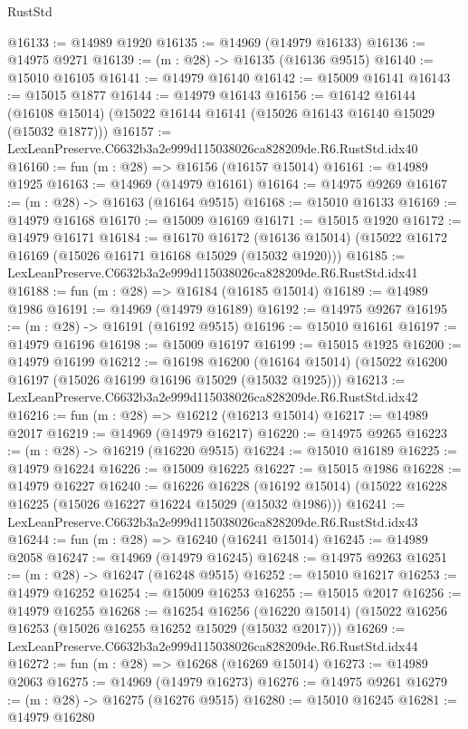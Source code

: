 \begin{lexlean}{RustStd}
\begin{coremodule}
@16133 := @14989 @1920
@16135 := @14969 (@14979 @16133)
@16136 := @14975 @9271
@16139 := (m : @28) -> @16135 (@16136 @9515)
@16140 := @15010 @16105
@16141 := @14979 @16140
@16142 := @15009 @16141
@16143 := @15015 @1877
@16144 := @14979 @16143
@16156 := @16142
    @16144
    (@16108 @15014)
    (@15022 @16144 @16141 (@15026 @16143 @16140 @15029 (@15032 @1877)))
@16157 := LexLeanPreserve.C6632b3a2e999d115038026ca828209de.R6.RustStd.idx40
@16160 := fun (m : @28) => @16156 (@16157 @15014)
@16161 := @14989 @1925
@16163 := @14969 (@14979 @16161)
@16164 := @14975 @9269
@16167 := (m : @28) -> @16163 (@16164 @9515)
@16168 := @15010 @16133
@16169 := @14979 @16168
@16170 := @15009 @16169
@16171 := @15015 @1920
@16172 := @14979 @16171
@16184 := @16170
    @16172
    (@16136 @15014)
    (@15022 @16172 @16169 (@15026 @16171 @16168 @15029 (@15032 @1920)))
@16185 := LexLeanPreserve.C6632b3a2e999d115038026ca828209de.R6.RustStd.idx41
@16188 := fun (m : @28) => @16184 (@16185 @15014)
@16189 := @14989 @1986
@16191 := @14969 (@14979 @16189)
@16192 := @14975 @9267
@16195 := (m : @28) -> @16191 (@16192 @9515)
@16196 := @15010 @16161
@16197 := @14979 @16196
@16198 := @15009 @16197
@16199 := @15015 @1925
@16200 := @14979 @16199
@16212 := @16198
    @16200
    (@16164 @15014)
    (@15022 @16200 @16197 (@15026 @16199 @16196 @15029 (@15032 @1925)))
@16213 := LexLeanPreserve.C6632b3a2e999d115038026ca828209de.R6.RustStd.idx42
@16216 := fun (m : @28) => @16212 (@16213 @15014)
@16217 := @14989 @2017
@16219 := @14969 (@14979 @16217)
@16220 := @14975 @9265
@16223 := (m : @28) -> @16219 (@16220 @9515)
@16224 := @15010 @16189
@16225 := @14979 @16224
@16226 := @15009 @16225
@16227 := @15015 @1986
@16228 := @14979 @16227
@16240 := @16226
    @16228
    (@16192 @15014)
    (@15022 @16228 @16225 (@15026 @16227 @16224 @15029 (@15032 @1986)))
@16241 := LexLeanPreserve.C6632b3a2e999d115038026ca828209de.R6.RustStd.idx43
@16244 := fun (m : @28) => @16240 (@16241 @15014)
@16245 := @14989 @2058
@16247 := @14969 (@14979 @16245)
@16248 := @14975 @9263
@16251 := (m : @28) -> @16247 (@16248 @9515)
@16252 := @15010 @16217
@16253 := @14979 @16252
@16254 := @15009 @16253
@16255 := @15015 @2017
@16256 := @14979 @16255
@16268 := @16254
    @16256
    (@16220 @15014)
    (@15022 @16256 @16253 (@15026 @16255 @16252 @15029 (@15032 @2017)))
@16269 := LexLeanPreserve.C6632b3a2e999d115038026ca828209de.R6.RustStd.idx44
@16272 := fun (m : @28) => @16268 (@16269 @15014)
@16273 := @14989 @2063
@16275 := @14969 (@14979 @16273)
@16276 := @14975 @9261
@16279 := (m : @28) -> @16275 (@16276 @9515)
@16280 := @15010 @16245
@16281 := @14979 @16280

\end{coremodule}
\end{lexlean}
